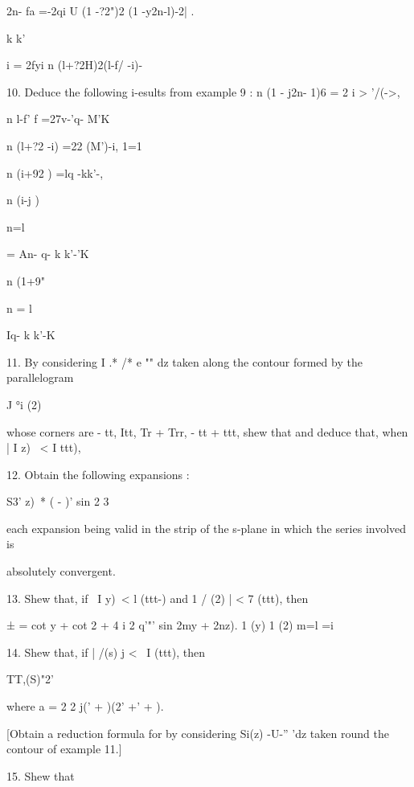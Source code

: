 2n- fa =-2qi U (1 -?2")2 (1 -y2n-l)-2| .

 


k k'

i = 2fyi n (l+?2H)2(l-f/ -i)-

10. Deduce the following i-esults from example 9 : n (1 - j2n- 1)6 = 2
i > '/(->,

n l-f' f =27v-'q- M'K\

n (l+?2 -i) =22 (M')-i, 1=1

n (i+92 ) =lq -kk'-,

n (i-j )

n=l

= An- q- k k'-'K\

n (1+9"

n = l

Iq- k k'-K


%
%

11. By considering I .* /* e "" dz taken along the contour formed by
the parallelogram

J °i (2)

whose corners are - tt, Itt, Tr + Trr, - tt + ttt, shew that and
deduce that, when | I z) \ < I ttt),

12. Obtain the following expansions :

S3' z)\ * ( - )' sin 2 3

each expansion being valid in the strip of the s-plane in which the
series involved is

absolutely convergent.


13. Shew that, if \ I y)\ < l (ttt-) and 1 / (2) | < 7 (ttt), then

  ± = cot y + cot 2 + 4 i 2 q'"' sin 2my + 2nz). 1 (y) 1 (2) m=l =i


14. Shew that, if | /(s) j < \ I (ttt), then

TT,(S)"2'

where a = 2 2 j(' + )(2' +' + ).


[Obtain a reduction formula for by considering Si(z) -U-'' 'dz taken
round the contour of example 11.]

15. Shew that

